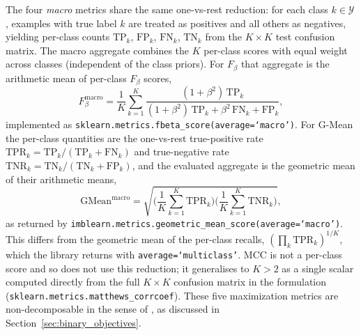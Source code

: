 The four \emph{macro} metrics share the same one-vs-rest reduction: for each class $k \in \mathcal{Y}$, examples with true label $k$ are treated as positives and all others as negatives, yielding per-class counts $\mathrm{TP}_k$, $\mathrm{FP}_k$, $\mathrm{FN}_k$, $\mathrm{TN}_k$ from the $K \times K$ test confusion matrix. The macro aggregate combines the $K$ per-class scores with equal weight across classes (independent of the class priors). For $F_\beta$ that aggregate is the arithmetic mean of per-class $F_\beta$ scores,
\begin{equation*}
F_\beta^{\mathrm{macro}} = \frac{1}{K}\sum_{k=1}^{K} \frac{(1+\beta^2)\,\mathrm{TP}_k}{(1+\beta^2)\,\mathrm{TP}_k + \beta^2\,\mathrm{FN}_k + \mathrm{FP}_k},
\end{equation*}
implemented as \texttt{sklearn.\allowbreak metrics.\allowbreak fbeta\_\allowbreak score(average=`macro')}. For G-Mean the per-class quantities are the one-vs-rest true-positive rate $\mathrm{TPR}_k = \mathrm{TP}_k / (\mathrm{TP}_k + \mathrm{FN}_k)$ and true-negative rate $\mathrm{TNR}_k = \mathrm{TN}_k / (\mathrm{TN}_k + \mathrm{FP}_k)$, and the evaluated aggregate is the geometric mean of their arithmetic means,
\begin{equation*}
\mathrm{GMean}^{\mathrm{macro}} = \sqrt{\Big(\frac{1}{K}\sum_{k=1}^{K} \mathrm{TPR}_k\Big)\Big(\frac{1}{K}\sum_{k=1}^{K} \mathrm{TNR}_k\Big)},
\end{equation*}
as returned by \texttt{imblearn.\allowbreak metrics.\allowbreak geometric\_\allowbreak mean\_\allowbreak score(average=`macro')}. This differs from the geometric mean of the per-class recalls, $(\prod_{k} \mathrm{TPR}_k)^{1/K}$, which the library returns with \texttt{average=`multiclass'}. MCC is not a per-class score and so does not use this reduction; it generalises to $K > 2$ as a single scalar computed directly from the full $K \times K$ confusion matrix in the \citet{gorodkin2004comparing} formulation (\texttt{sklearn.\allowbreak metrics.\allowbreak matthews\_\allowbreak corrcoef}). These five maximization metrics are non-decomposable in the sense of \citet{narasimhan2015optimizing}, as discussed in Section~\ref{sec:binary_objectives}.

